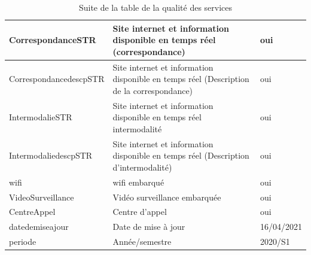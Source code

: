 \documentclass[a4paper]{report}
\begin{document}
\begin{doublespace}
\begin{table}[H]
\begin{center}
\begin{tabularx}{17.5cm}{|p{4cm}|X|p{2.5cm}|}
				\hline
				CorrespondanceSTR                       & Site internet et information disponible en temps réel (correspondance) & oui              \\
				\hline
				CorrespondancedescpSTR                  & Site internet et information disponible en temps
				réel (Description de la correspondance) & oui                                                                                       \\
				\hline
				IntermodalieSTR                         & Site internet et information disponible en temps réel intermodalité    & oui              \\
				\hline
				IntermodaliedescpSTR                    & Site internet et information disponible en temps
				réel (Description d'intermodalité)      & oui                                                                                       \\
				\hline
				wifi                                    & wifi embarqué                                                          & oui              \\
				\hline
				VideoSurveillance                       & Vidéo surveillance embarquée                                           & oui              \\
				\hline
				CentreAppel                             & Centre d'appel                                                         & oui              \\
				\hline
				datedemiseajour                         & Date de mise à jour                                                    & 16/04/2021       \\
				\hline
				periode                                 & Année/semestre                                                         & 2020/S1          \\
				\hline
			\end{tabularx}
			\caption{Suite de la table de la qualité des services}
		\end{center}
	\end{table}


\end{doublespace}
\end{document}
